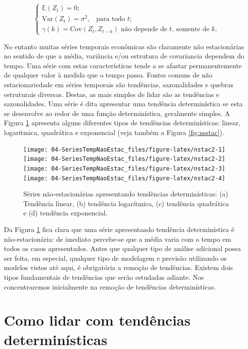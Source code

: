 \documentclass[
]{book}
\theoremstyle{definition}
\theoremstyle{definition}
\theoremstyle{definition}
\theoremstyle{remark}
\begin{document}
\[
\left\{
\begin{array}{l}
\mathbb{E}(Z_t)=0; \\
\mbox{Var}(Z_t)=\sigma^2, \,\,\,\mbox{ para todo $t$}; \\
\gamma(k)=\mbox{Cov}(Z_t,Z_{t-k})\mbox{ não depende de $t$, somente de $k$}.
\end{array}\right.
\]

No entanto muitas séries temporais econômicas são claramente não estacionárias no sentido de que a média, variância e/ou estrutura de covariancia dependem do tempo. Uma série com estas características tende a se afastar permanentemente de qualquer valor à medida que o tempo passa. Fontes comuns de não estacionariedade em séries temporais são tendências, sazonalidades e quebras estruturais diversas. Destas, as mais simples de lidar são as tendências e sazonalidades. Uma série é dita apresentar uma tendência determinística se esta se desenvolve ao redor de uma função determinística, geralmente simples. A Figura \ref{fig:nstac2} apresenta alguns diferentes tipos de tendências determinísticas: linear, logaritmica, quadrática e exponencial (veja também a Figura \ref{fig:nsstac}).

\begin{figure}
\texttt{[image: 04-SeriesTempNaoEstac\_files/figure-latex/nstac2-1]} \texttt{[image: 04-SeriesTempNaoEstac\_files/figure-latex/nstac2-2]} \texttt{[image: 04-SeriesTempNaoEstac\_files/figure-latex/nstac2-3]} \texttt{[image: 04-SeriesTempNaoEstac\_files/figure-latex/nstac2-4]} \caption{Séries não-estacionárias apresentando tendências determinísticas: (a) Tendência linear, (b) tendência logarítmica, (c) tendência quadrática e (d) tendência exponencial.}\label{fig:nstac2}
\end{figure}

Da Figura \ref{fig:nstac2} fica clara que uma série apresentando tendência determinística é não-estacionária: de imediato percebe-se que a média varia com o tempo em todos os casos apresentados. Antes que qualquer tipo de análise adicional possa ser feita, em especial, qualquer tipo de modelagem e previsão utilizando os modelos vistos até aqui, é obrigatória a remoção de tendências. Existem dois tipos fundamentais de tendências que serão estudadas adiante. Nos concentraremos inicialmente na remoção de tendências determinísticas.

\hypertarget{como-lidar-com-tenduxeancias-determinuxedsticas}{%
\section{Como lidar com tendências determinísticas}\label{como-lidar-com-tenduxeancias-determinuxedsticas}}
\end{document}
